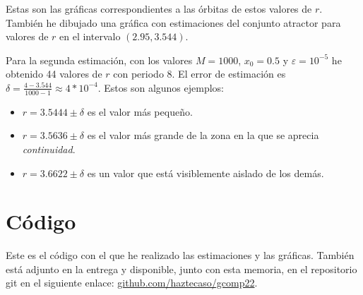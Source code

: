 \documentclass[10pt, spanish]{article}
\theoremstyle{definition}
\theoremstyle{break}
\begin{document}
Estas son las gráficas correspondientes a las órbitas de estos valores de $r$.
También he dibujado una gráfica con estimaciones del conjunto atractor para
valores de $r$ en el intervalo $(2.95, 3.544)$.

\begin{center}
    \scalebox{0.5}{}
\end{center}

Para la segunda estimación, con los valores $M=1000$, $x_0=0.5$ y
$\varepsilon=10^{-5}$ he obtenido 44 valores de $r$ con periodo $8$. El error de
estimación es $\delta = \frac{4-3.544}{1000-1}\approx4*10^{-4}$. Estos son
algunos ejemplos:

\begin{itemize}
    \item $r = 3.5444\pm \delta$ es el valor más pequeño.
    \item $r = 3.5636\pm\delta$ es el valor más grande de la zona en
        la que se aprecia \textit{continuidad}.
    \item $r = 3.6622\pm\delta$ es un valor que está
        visiblemente aislado de los demás.
\end{itemize}

\begin{center}
    \scalebox{0.5}{}
\end{center}

\section{Código}

Este es el código con el que he realizado las estimaciones y las gráficas.
También está adjunto en la entrega y disponible, junto con esta memoria, en el
repositorio git en el siguiente enlace:
\href{https://www.github.com/haztecaso/gcomp22}{github.com/haztecaso/gcomp22}.
\vspace{1em}


\end{document}
